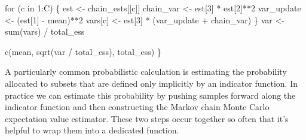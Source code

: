 \documentclass[
  letterpaper,
  DIV=11,
  numbers=noendperiod]{scrartcl}
\newenvironment{Shaded}{\begin{snugshade}}{\end{snugshade}}
\newcommand{\BuiltInTok}[1]{\textcolor[rgb]{0.00,0.23,0.31}{#1}}
\newcommand{\ControlFlowTok}[1]{\textcolor[rgb]{0.00,0.23,0.31}{#1}}
\newcommand{\DecValTok}[1]{\textcolor[rgb]{0.68,0.00,0.00}{#1}}
\newcommand{\KeywordTok}[1]{\textcolor[rgb]{0.00,0.23,0.31}{#1}}
\newcommand{\NormalTok}[1]{\textcolor[rgb]{0.00,0.23,0.31}{#1}}
\newcommand{\OperatorTok}[1]{\textcolor[rgb]{0.37,0.37,0.37}{#1}}
\begin{document}
\begin{Shaded}
\begin{Highlighting}[]
  \ControlFlowTok{for}\NormalTok{ (c }\KeywordTok{in} \DecValTok{1}\NormalTok{:C) \{}
\NormalTok{    est }\OperatorTok{\textless{}{-}}\NormalTok{ chain\_ests[[c]]}
\NormalTok{    chain\_var }\OperatorTok{\textless{}{-}}\NormalTok{ est[}\DecValTok{3}\NormalTok{] }\OperatorTok{*}\NormalTok{ est[}\DecValTok{2}\NormalTok{]}\OperatorTok{**}\DecValTok{2}
\NormalTok{    var\_update }\OperatorTok{\textless{}{-}}\NormalTok{ (est[}\DecValTok{1}\NormalTok{] }\OperatorTok{{-}}\NormalTok{ mean)}\OperatorTok{**}\DecValTok{2}
    \BuiltInTok{vars}\NormalTok{[c] }\OperatorTok{\textless{}{-}}\NormalTok{ est[}\DecValTok{3}\NormalTok{] }\OperatorTok{*}\NormalTok{ (var\_update }\OperatorTok{+}\NormalTok{ chain\_var)}
\NormalTok{  \}}
\NormalTok{  var }\OperatorTok{\textless{}{-}} \BuiltInTok{sum}\NormalTok{(}\BuiltInTok{vars}\NormalTok{) }\OperatorTok{/}\NormalTok{ total\_ess}
  
\NormalTok{  c(mean, sqrt(var }\OperatorTok{/}\NormalTok{ total\_ess), total\_ess)}
\NormalTok{\}}
\end{Highlighting}
\end{Shaded}

A particularly common probabilistic calculation is estimating the
probability allocated to subsets that are defined only implicitly by an
indicator function. In practice we can estimate this probability by
pushing samples forward along the indicator function and then
constructing the Markov chain Monte Carlo expectation value estimator.
These two steps occur together so often that it's helpful to wrap them
into a dedicated function.
\end{document}
